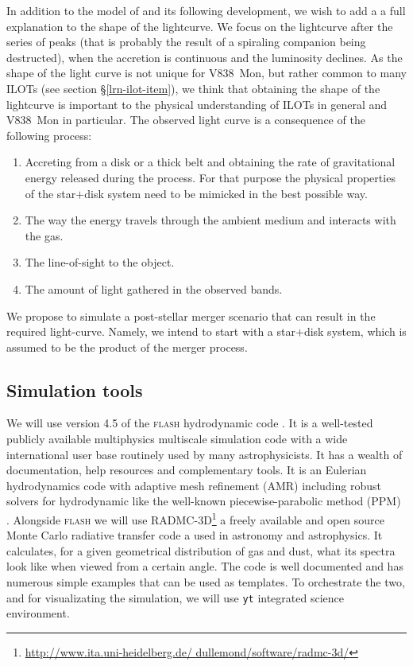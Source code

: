 \documentclass[a4paper,modern]{aastex62}
\begin{document}
In addition to the model of \citep{2005A&A...436.1009T,2006A&A...451..223T} and its following development, we wish to add a a full explanation to the shape of the lightcurve.
We focus on the lightcurve after the series of peaks (that is probably the result of a spiraling companion being destructed), when the accretion is continuous and the luminosity declines.
As the shape of the light curve is not unique for V838~Mon, but rather common to many ILOTs (see section \S \ref{lrn-ilot-item}), we think that obtaining the shape of the lightcurve is important to the physical understanding of ILOTs in general and V838~Mon in particular.
The observed light curve is a consequence of the following process:
\begin{enumerate}
    \item Accreting from a disk or a thick belt and obtaining the rate of gravitational energy released during the process. For that purpose the physical properties of the star$+$disk system need to be mimicked \citep{2005A&A...434.1107M,2005A&A...441.1099T,2006CBET..780....1M,2007ASPC..363.....C} in the best possible way.
    \item The way the energy travels through the ambient medium and interacts with the gas.
    \item The line-of-sight to the object.
    \item The amount of light gathered in the observed bands.
\end{enumerate}

We propose to simulate a post-stellar merger scenario that can result in the required light-curve. Namely, we intend to start with a star$+$disk system, which is assumed to be the product of the merger process.

\subsection{Simulation tools}
We will use version 4.5 of the \textsc{flash} hydrodynamic code \cite{2000ApJS..131..273F}. It is a well-tested publicly available multiphysics multiscale simulation code with a wide international user base routinely used by many astrophysicists. It has a wealth of documentation, help resources and complementary tools. It is an Eulerian hydrodynamics code with adaptive mesh refinement (AMR) including robust solvers for hydrodynamic like the well-known piecewise-parabolic method (PPM) \cite{1984JCoPh..54..174C}. Alongside \textsc{flash} we will use RADMC-3D\footnote{\url{http://www.ita.uni-heidelberg.de/ dullemond/software/radmc-3d/}} \citep{2012ascl.soft02015D} a freely available and open source Monte Carlo radiative transfer code a used in astronomy and astrophysics. It calculates, for a given geometrical distribution of gas and dust, what its spectra look like when viewed from a certain angle. The code is well documented and has numerous simple examples that can be used as templates. To orchestrate the two, and for visualizating the simulation, we will use \texttt{yt} \citep{2011ApJS..192....9T} integrated science environment.
\end{document}
